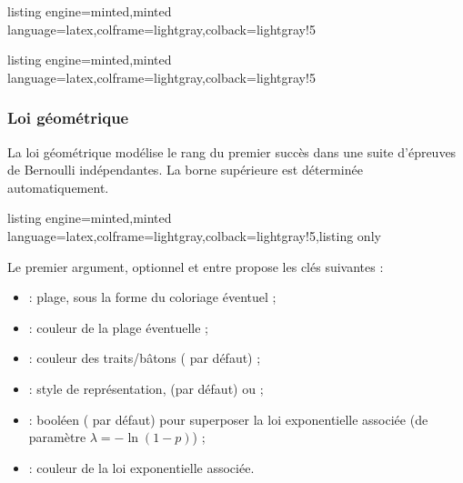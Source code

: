 \documentclass[11pt,a4paper]{ltxdoc}
\begin{document}
\begin{tcblisting}{listing engine=minted,minted language=latex,colframe=lightgray,colback=lightgray!5}
\begin{GraphiqueTikz}%
    [x=0.75cm,y=20cm,Xgrille=1,Ygrille=0.05,Xmin=-1,Xmax=15,Ymin=0,Ymax=0.20]
\end{GraphiqueTikz}
\end{tcblisting}

\begin{tcblisting}{listing engine=minted,minted language=latex,colframe=lightgray,colback=lightgray!5}
\begin{GraphiqueTikz}%
    [x=0.75cm,y=20cm,Xgrille=1,Ygrille=0.05,Xmin=-1,Xmax=15,Ymin=0,Ymax=0.20]
\end{GraphiqueTikz}
\end{tcblisting}

\subsubsection{Loi géométrique}\label{loigeo}
La loi géométrique modélise le rang du premier succès dans une suite d'épreuves de Bernoulli indépendantes. La borne supérieure est déterminée automatiquement.

\begin{tcblisting}{listing engine=minted,minted language=latex,colframe=lightgray,colback=lightgray!5,listing only}
\end{tcblisting}

Le premier argument, optionnel et entre \MontreCode{[...]} propose les clés suivantes :

\begin{itemize}
  \item {} : plage, sous la forme  du coloriage éventuel ;
  \item {} : couleur de la plage éventuelle ;
  \item {} : couleur des traits/bâtons ( par défaut) ;
  \item {} : style de représentation,  (par défaut) ou  ;
  \item {} : booléen ( par défaut) pour superposer la loi exponentielle associée (de paramètre $\lambda = -\ln(1-p)$) ;
  \item {} : couleur de la loi exponentielle associée.
\end{itemize}
\end{document}
